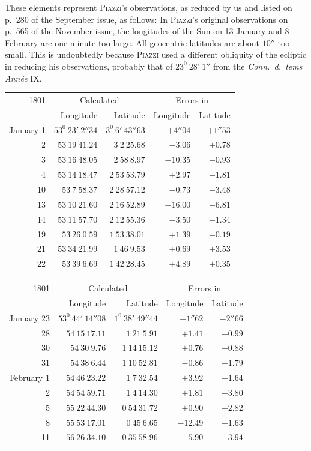 These elements represent \textsc{Piazzi}'s observations, as reduced by us and listed on p.\ 280 of the September issue, as follows:
\expandafter\def\csname HistoricalNoteText17\endcsname{In \textsc{Piazzi}'s original observations on p.\ 565 of the November issue, the longitudes of the Sun on 13 January and 8 February are one minute too large. All geocentric latitudes are about $10''$ too small. This is undoubtedly because \textsc{Piazzi} used a different obliquity of the ecliptic in reducing his observations, probably that of $23^0\ 28'\ 1''$ from the \textit{Conn.\ d.\ tems Année} IX.}
%
\begin{center}
{\small\setlength{\tabcolsep}{4pt}
\begin{tabular}{r|r|r|r|r}
1801&\multicolumn{2}{c|}{Calculated}&\multicolumn{2}{c}{Errors in}\\
&Longitude&Latitude&Longitude&Latitude\\\hline
January 1&$53^0\ 23'\ 2''34$&$3^0\ 6'\ 43''63$&$+4''04$&$+1''53$\\
2&$53\ 19\ 41.24$&$3\ 2\ 25.68$&$-3.06$&$+0.78$\\
3&$53\ 16\ 48.05$&$2\ 58\ 8.97$&$-10.35$&$-0.93$\\
4&$53\ 14\ 18.47$&$2\ 53\ 53.79$&$+2.97$&$-1.81$\\
10&$53\ 7\ 58.37$&$2\ 28\ 57.12$&$-0.73$&$-3.48$\\
13&$53\ 10\ 21.60$&$2\ 16\ 52.89$&$-16.00$&$-6.81$\\
14&$53\ 11\ 57.70$&$2\ 12\ 55.36$&$-3.50$&$-1.34$\\
19&$53\ 26\ 0.59$&$1\ 53\ 38.01$&$+1.39$&$-0.19$\\
21&$53\ 34\ 21.99$&$1\ 46\ 9.53$&$+0.69$&$+3.53$\\
22&$53\ 39\ 6.69$&$1\ 42\ 28.45$&$+4.89$&$+0.35$
\end{tabular}
\par\medskip
\begin{tabular}{r|r|r|r|r}
1801&\multicolumn{2}{c|}{Calculated}&\multicolumn{2}{c}{Errors in}\\
&Longitude&Latitude&Longitude&Latitude\\\hline
January 23&$53^0\ 44'\ 14''08$&$1^0\ 38'\ 49''44$&$-1''62$&$-2''66$\\
28&$54\ 15\ 17.11$&$1\ 21\ 5.91$&$+1.41$&$-0.99$\\
30&$54\ 30\ 9.76$&$1\ 14\ 15.12$&$+0.76$&$-0.88$\\
31&$54\ 38\ 6.44$&$1\ 10\ 52.81$&$-0.86$&$-1.79$\\
February 1&$54\ 46\ 23.22$&$1\ 7\ 32.54$&$+3.92$&$+1.64$\\
2&$54\ 54\ 59.71$&$1\ 4\ 14.30$&$+1.81$&$+3.80$\\
5&$55\ 22\ 44.30$&$0\ 54\ 31.72$&$+0.90$&$+2.82$\\
8&$55\ 53\ 17.01$&$0\ 45\ 6.65$&$-12.49$&$+1.63$\\
11&$56\ 26\ 34.10$&$0\ 35\ 58.96$&$-5.90$&$-3.94$
\end{tabular}}
\end{center}
